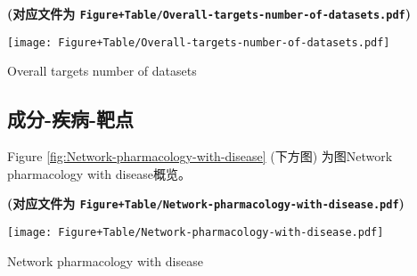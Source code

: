 \documentclass[
]{article}
\newenvironment{Shaded}{\begin{snugshade}}{\end{snugshade}}
\newcommand{\DataTypeTok}[1]{\textcolor[rgb]{0.13,0.29,0.53}{#1}}
\newcommand{\KeywordTok}[1]{\textcolor[rgb]{0.13,0.29,0.53}{\textbf{#1}}}
\newcommand{\NormalTok}[1]{#1}
\newcommand{\OperatorTok}[1]{\textcolor[rgb]{0.81,0.36,0.00}{\textbf{#1}}}
\newcommand{\StringTok}[1]{\textcolor[rgb]{0.31,0.60,0.02}{#1}}
\begin{document}
\textbf{(对应文件为 \texttt{Figure+Table/Overall-targets-number-of-datasets.pdf})}

\def\@captype{figure}
\begin{center}
\texttt{[image: Figure+Table/Overall-targets-number-of-datasets.pdf]}
\caption{Overall targets number of datasets}\label{fig:Overall-targets-number-of-datasets}
\end{center}

\begin{center}\vspace{1.5cm}\end{center}

\hypertarget{ux6210ux5206-ux75beux75c5-ux9776ux70b9}{%
\subsection{成分-疾病-靶点}\label{ux6210ux5206-ux75beux75c5-ux9776ux70b9}}

\begin{Shaded}
\end{Shaded}

\begin{center}\vspace{1.5cm}\end{center}

Figure \ref{fig:Network-pharmacology-with-disease} (下方图) 为图Network pharmacology with disease概览。

\textbf{(对应文件为 \texttt{Figure+Table/Network-pharmacology-with-disease.pdf})}

\def\@captype{figure}
\begin{center}
\texttt{[image: Figure+Table/Network-pharmacology-with-disease.pdf]}
\caption{Network pharmacology with disease}\label{fig:Network-pharmacology-with-disease}
\end{center}
\end{document}
